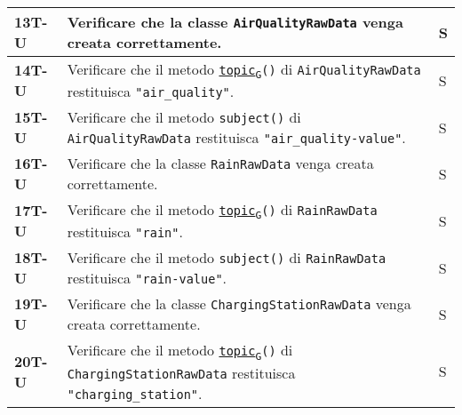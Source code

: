 \begin{longtable}{|>{\raggedright\arraybackslash}m{}|>{\raggedright\arraybackslash}m{}|>{\raggedright\arraybackslash}m{}|}
	\hline
	\textbf{13T-U}  & Verificare che la classe \texttt{AirQualityRawData} venga creata correttamente.                                                                                                                                                                  & S              \\
	\hline
	\textbf{14T-U}  & Verificare che il metodo \texttt{\href{https://7last.github.io/docs/rtb/documentazione-interna/glossario\#topic}{topic\textsubscript{G}}()} di \texttt{AirQualityRawData} restituisca \texttt{"air\_quality"}.                                   & S              \\
	\hline
	\textbf{15T-U}  & Verificare che il metodo \texttt{subject()} di \texttt{AirQualityRawData} restituisca \texttt{"air\_quality-value"}.                                                                                                                             & S              \\
	\hline
	\textbf{16T-U}  & Verificare che la classe \texttt{RainRawData} venga creata correttamente.                                                                                                                                                                        & S              \\
	\hline
	\textbf{17T-U}  & Verificare che il metodo \texttt{\href{https://7last.github.io/docs/rtb/documentazione-interna/glossario\#topic}{topic\textsubscript{G}}()} di \texttt{RainRawData} restituisca \texttt{"rain"}.                                                 & S              \\
	\hline
	\textbf{18T-U}  & Verificare che il metodo \texttt{subject()} di \texttt{RainRawData} restituisca \texttt{"rain-value"}.                                                                                                                                           & S              \\
	\hline
	\textbf{19T-U}  & Verificare che la classe \texttt{ChargingStationRawData} venga creata correttamente.                                                                                                                                                             & S              \\
	\hline
	\textbf{20T-U}  & Verificare che il metodo \texttt{\href{https://7last.github.io/docs/rtb/documentazione-interna/glossario\#topic}{topic\textsubscript{G}}()} di \texttt{ChargingStationRawData} restituisca \texttt{"charging\_station"}.                         & S              \\

\end{longtable}
